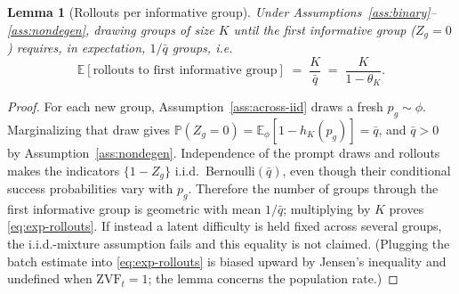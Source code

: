 \documentclass[11pt]{article}
\theoremstyle{plain}
\newtheorem{lemma}{Lemma}
\theoremstyle{definition}
\theoremstyle{remark}
\newcommand{\ZVF}{\ensuremath{\mathrm{ZVF}}}
\newcommand{\E}{\mathbb{E}}
\newcommand{\Prob}{\mathbb{P}}
\newcommand{\1}{\mathbb{1}}
\begin{document}
\begin{lemma}[Rollouts per informative group]\label{lem:rollouts-per-group}
Under Assumptions~\ref{ass:binary}--\ref{ass:nondegen}, drawing groups of
size $K$ until the first informative group ($Z_g=0$) requires, in expectation,
$1/\bar q$ groups, i.e.\
\begin{equation}\label{eq:exp-rollouts}
\E[\text{rollouts to first informative group}] \;=\; \frac{K}{\bar q}
\;=\; \frac{K}{1-\theta_K}.
\end{equation}
\end{lemma}
\begin{proof}
For each new group, Assumption~\ref{ass:across-iid} draws a fresh
$p_g\sim\phi$. Marginalizing that draw gives
$\Prob(Z_g=0)=\E_\phi[1-h_K(p_g)]=\bar q$, and $\bar q>0$ by
Assumption~\ref{ass:nondegen}. Independence of the prompt draws and
rollouts makes the indicators $\{1-Z_g\}$ i.i.d.\ Bernoulli$(\bar q)$, even
though their conditional success probabilities vary with $p_g$. Therefore the
number of groups through the first informative group is geometric with mean
$1/\bar q$; multiplying by $K$ proves \eqref{eq:exp-rollouts}. If instead a
latent difficulty is held fixed across several groups, the i.i.d.-mixture
assumption fails and this equality is not claimed. (Plugging the batch
estimate into \eqref{eq:exp-rollouts} is biased upward by Jensen's inequality
and undefined when $\ZVF_t=1$; the lemma concerns the population rate.)
\end{proof}
\end{document}
